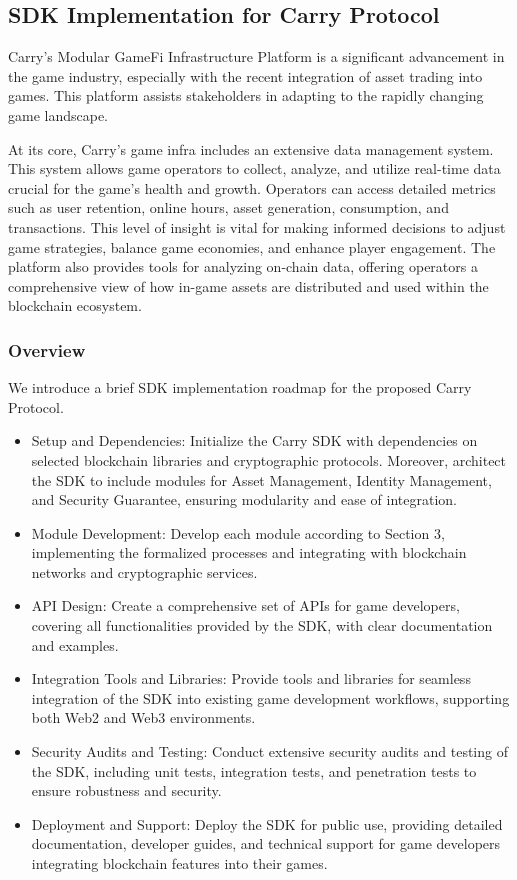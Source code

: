 \subsection{SDK Implementation for Carry Protocol}

Carry's Modular GameFi Infrastructure Platform is a significant advancement in the game industry, especially with the recent integration of asset trading into games. This platform assists stakeholders in adapting to the rapidly changing game landscape.

At its core, Carry's game infra includes an extensive data management system. This system allows game operators to collect, analyze, and utilize real-time data crucial for the game's health and growth. Operators can access detailed metrics such as user retention, online hours, asset generation, consumption, and transactions. This level of insight is vital for making informed decisions to adjust game strategies, balance game economies, and enhance player engagement. The platform also provides tools for analyzing on-chain data, offering operators a comprehensive view of how in-game assets are distributed and used within the blockchain ecosystem. 
\subsubsection{Overview}
We introduce a brief SDK implementation roadmap for the proposed Carry Protocol.
\begin{itemize}
    \item Setup and Dependencies: Initialize the Carry SDK with dependencies on selected blockchain libraries and cryptographic protocols. Moreover, architect the SDK to include modules for Asset Management, Identity Management, and Security Guarantee, ensuring modularity and ease of integration.
\item Module Development: Develop each module according to Section 3, implementing the formalized processes and integrating with blockchain networks and cryptographic services.
\item API Design: Create a comprehensive set of APIs for game developers, covering all functionalities provided by the SDK, with clear documentation and examples.
\item Integration Tools and Libraries: Provide tools and libraries for seamless integration of the SDK into existing game development workflows, supporting both Web2 and Web3 environments.
\item Security Audits and Testing: Conduct extensive security audits and testing of the SDK, including unit tests, integration tests, and penetration tests to ensure robustness and security.
\item Deployment and Support: Deploy the SDK for public use, providing detailed documentation, developer guides, and technical support for game developers integrating blockchain features into their games.
\end{itemize}

